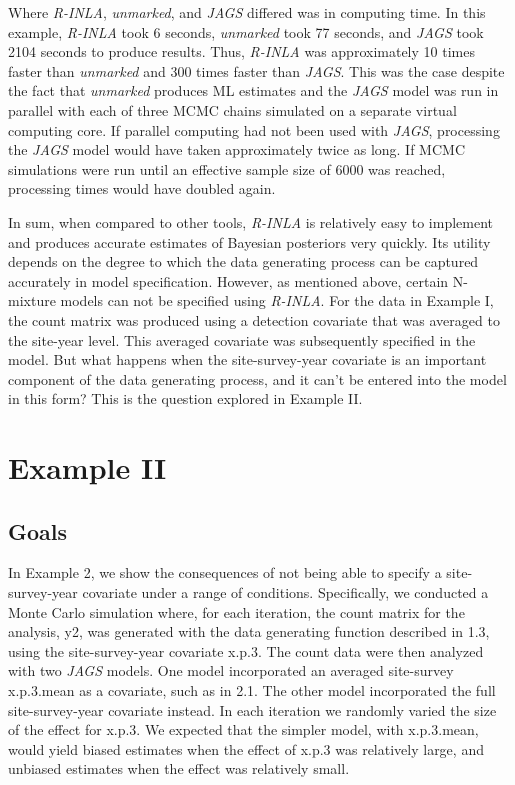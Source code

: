 \documentclass{article}
\begin{document}
Where \emph{R-INLA}, \emph{unmarked}, and \emph{JAGS} differed was in computing time.  In this example, \emph{R-INLA} took 6 seconds, \emph{unmarked} took 77 seconds, and \emph{JAGS} took 2104 seconds to produce results. Thus, \emph{R-INLA} was approximately 10 times faster than \emph{unmarked} and 300 times faster than \emph{JAGS}. This was the case despite the fact that \emph{unmarked} produces ML estimates and the \emph{JAGS} model was run in parallel with each of three MCMC chains simulated on a separate virtual computing core. If parallel computing had not been used with \emph{JAGS}, processing the \emph{JAGS} model would have taken approximately twice as long. If MCMC simulations were run until an effective sample size of 6000 was reached, processing times would have doubled again.

In sum, when compared to other tools, \emph{R-INLA} is relatively easy to implement and produces accurate estimates of Bayesian posteriors very quickly. Its utility depends on the degree to which the data generating process can be captured accurately in model specification. However, as mentioned above, certain N-mixture models can not be specified using \emph{R-INLA}. For the data in Example I, the count matrix was produced using a detection covariate that was averaged to the site-year level. This averaged covariate was subsequently specified in the model. But what happens when the site-survey-year covariate is an important component of the data generating process, and it can't be entered into the model in this form? This is the question explored in Example II.

\section[Example II]{Example II}
\subsection[Goals]{Goals}
In Example 2, we show the consequences of not being able to specify a site-survey-year covariate under a range of conditions. Specifically, we conducted a Monte Carlo simulation where, for each iteration, the count matrix for the analysis, y2, was generated with the data generating function described in 1.3, using the site-survey-year covariate x.p.3. The count data were then analyzed with two \emph{JAGS} models. One model incorporated an averaged site-survey x.p.3.mean as a covariate, such as in 2.1. The other model incorporated the full site-survey-year covariate instead. In each iteration we randomly varied the size of the effect for x.p.3. We expected that the simpler model, with x.p.3.mean, would yield biased estimates when the effect of x.p.3 was relatively large, and unbiased estimates when the effect was relatively small.
\end{document}
